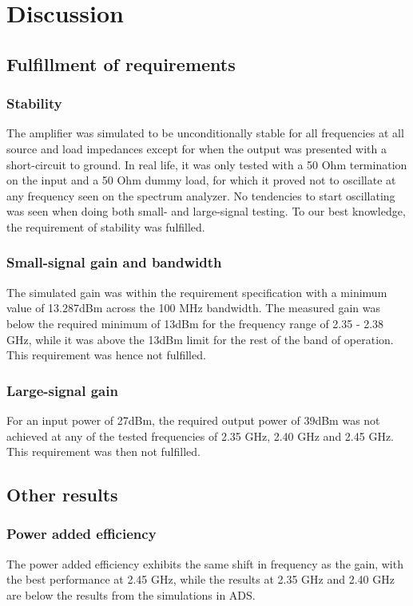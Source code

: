 \chapter{Discussion}

  \section{Fulfillment of requirements}
	\subsection{Stability}
	The amplifier was simulated to be unconditionally stable for all frequencies at all source and load impedances except for when the output was presented with a short-circuit to ground. In real life, it was only tested with a 50 Ohm termination on the input and a 50 Ohm dummy load, for which it proved not to oscillate at any frequency seen on the spectrum analyzer. No tendencies to start oscillating was seen when doing both small- and large-signal testing. To our best knowledge, the requirement of stability was fulfilled.
	\subsection{Small-signal gain and bandwidth}
	The simulated gain was within the requirement specification with a minimum value of 13.287dBm across the 100 MHz bandwidth. The measured gain was below the required minimum of 13dBm for the frequency range of 2.35 - 2.38 GHz, while it was above the 13dBm limit for the rest of the band of operation. This requirement was hence not fulfilled.
	\subsection{Large-signal gain}
	For an input power of 27dBm, the required output power of 39dBm was not achieved at any of the tested frequencies of 2.35 GHz, 2.40 GHz and 2.45 GHz. This requirement was then not fulfilled.
  \section{Other results}
	\subsection{Power added efficiency}
	The power added efficiency exhibits the same shift in frequency as the gain, with the best performance at 2.45 GHz, while the results at 2.35 GHz and 2.40 GHz are below the results from the simulations in ADS. 
